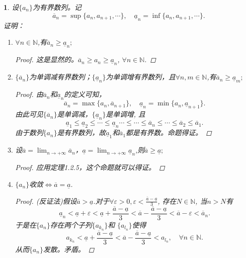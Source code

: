 \documentclass[utf8]{book}
\newtheorem{example}{}[section]             %
\begin{document}
\begin{example}
设$\{a_n\}$为有界数列。记
$$\overline{a}_n = \sup\{a_n, a_{n+1}, \cdots\}, \quad\underline{a}_n= \inf\{a_n, a_{n+1},\cdots\}.$$
证明：
\renewcommand\labelenumi{\normalfont(\theenumi)}
\begin{enumerate}
\item $\forall n\in\mathbb{N}$,有$\overline{a}_n \geq\underline{a}_n;$
\begin{proof}
这是显然的。$\overline{a}_n \geq a_n \geq \underline{a}_n$, $\forall n\in \mathbb{N}$.
\end{proof}
\item $\{\overline{a}_n\}$为单调减有界数列；$\{\underline{a}_n\}$为单调增有界数列，且$\forall n,m\in\mathbb{N}$,有$\overline{a}_n \geq\underline{a}_m;$
\begin{proof}
由$\overline{a}_n$和$\underline{a}_n$的定义可知，
$$\overline{a}_n = \max\{a_n, \overline{a}_{n+1}\}, \quad \underline{a}_n = \min\{a_n, \underline{a}_{n+1}\}.$$
由此可见$\{\overline{a}_n\}$是单调减，$\{\underline{a}_n\}$是单调增, 且
$$\underline{a}_1 \leq \underline{a}_2\leq \cdots\leq \underline{a}_n \cdots \leq \cdots \leq \overline{a}_n \leq \cdots \leq \overline{a}_2 \leq \overline{a}_1.$$
由于数列$\{a_n\}$是有界数列，故$\underline{a}_1$和$\overline{a}_1$都是有界数。命题得证。
\end{proof}
\item 设$\overline{a}=\displaystyle  \lim_{n\to +\infty}\overline{a}_n$，$\underline{a}=\displaystyle  \lim_{n\to +\infty}\underline{a}_n$,则$\overline{a}\geq \underline{a};$
\begin{proof}
应用定理1.2.5，这个命题就可以得证。
\end{proof}
\item $\{a_n\}$收敛$\Leftrightarrow \overline{a}=\underline{a}$.
\begin{proof}
(反证法)假设$\overline{a} > \underline{a}$.对于$\forall \varepsilon > 0, \varepsilon < \frac{\overline{a} - \underline{a}}{3}$, 存在$N\in\mathbb{N}$, 当$n>N$有
$$\underline{a}_n < \underline{a} +\varepsilon < \underline{a} + \frac{\overline{a}-\underline{a}}{3} < \overline{a} - \frac{\overline{a}-\underline{a}}{3} < \overline{a}-\varepsilon < \overline{a}_n.$$
于是在$\{a_n\}$存在两个子列$\{a_{k_n}\}$和
$\{a_{l_n}\}$使得
$$a_{k_n} < \underline{a} + \frac{\overline{a}-\underline{a}}{3} < \overline{a} - \frac{\overline{a}-\underline{a}}{3} < a_{l_n}, \quad \forall n\in\mathbb{N}.$$
从而$\{a_n\}$发散。矛盾。
\end{proof}
\end{enumerate}
\end{example}
\end{document}
